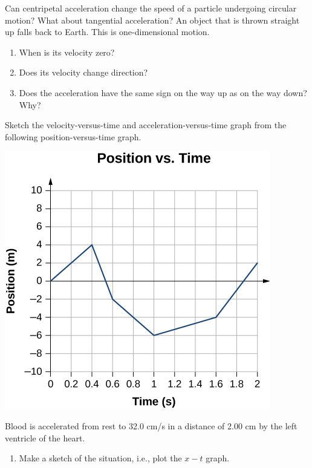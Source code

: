 \documentclass[12pt,addpoints]{exam}
\begin{document}
\begin{center}
\begin{questions}
\begin{enumerate}[label=(\alph*)]
			\end{enumerate}
			\question Can centripetal acceleration change the speed of a particle undergoing circular motion? What about tangential acceleration?\vspace{1in}		
			\question An object that is thrown straight up falls back to Earth. This is one-dimensional motion. 
			\begin{enumerate}[label=(\alph*)]
				\item When is its velocity zero?\vspace{0.3in}
				\item Does its velocity change direction?\vspace{0.3in}  
				\item Does the acceleration have the same sign on the way up as on the way down? Why?\vspace{0.3in}
			\end{enumerate} 
			\question Sketch the velocity-versus-time and acceleration-versus-time graph from the following position-versus-time graph.
			\begin{center}
				\includegraphics[scale=0.8]{graph3.jpeg}
			\end{center}
			\vspace{2in}
			\question Blood is accelerated from rest to 32.0 cm/s in a distance of 2.00 cm by the left ventricle of the heart. 
			\begin{enumerate}[label=(\alph*)]
				\item Make a sketch of the situation, i.e., plot the $x-t$ graph. \vspace{1in}

\end{enumerate}
\end{questions}
\end{center}
\end{document}
